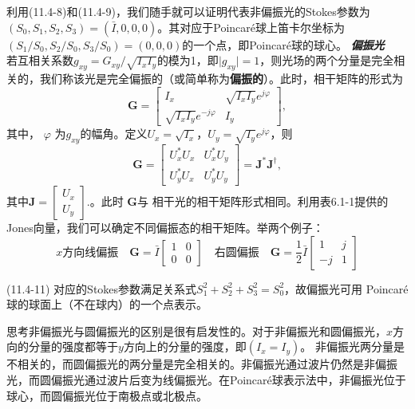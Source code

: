 \documentclass[UTF8]{ctexart}
\numberwithin{figure}{subsection}
\numberwithin{table}{subsection}
\begin{document}
\par 利用(11.4-8)和(11.4-9)，我们随手就可以证明代表非偏振光的Stokes参数为$(S_0, S_1, S_2, S_3) = (\bar{I}, 0, 0, 0)$。其对应于Poincar\'{e}球上笛卡尔坐标为$(S_1 / S_0, S_2 / S_0, S_3 / S_0) = (0, 0, 0)$的一个点，即Poincar\'{e}球的球心。
\bigbreak\noindent\textcolor{ksc}{\textbf{\textsl{偏振光}}}\\
若互相关系数$g_{xy} = G_{xy} / \sqrt{I_x I_y}$的模为1，即$\lvert g_{xy} \rvert = 1$，则光场的两个分量是完全相关的，我们称该光是完全偏振的（或简单称为\textbf{偏振的}）。此时，相干矩阵的形式为
\begin{equation}
\mathbf{G} = 
\begin{bmatrix}
I_x & \sqrt{I_x I_y}e^{j\varphi} \\
\sqrt{I_x I_y}e^{-j\varphi} & I_y
\end{bmatrix} ,
\end{equation}
其中， $\varphi$ 为$g_{xy}$的幅角。定义$U_x = \sqrt{I_x}$，$U_y = \sqrt{I_y}e^{j\varphi}$，则
\begin{equation}
\mathbf{G} =
\begin{bmatrix}
U_x^\ast U_x & U_x^\ast U_y \\
U_y^\ast U_x & U_y^\ast U_y
\end{bmatrix}
= \mathbf{J^\ast J^\dag} ,
\end{equation}
其中$\mathbf{J} = \begin{bmatrix}U_x \\ U_y \end{bmatrix}$.。此时 $\mathbf{G}$与 相干光的相干矩阵形式相同。利用表6.1-1提供的Jones向量，我们可以确定不同偏振态的相干矩阵。举两个例子：
\begin{equation*}
\text{$x$方向线偏振} \quad \mathbf{G} = \bar{I}
\begin{bmatrix}
1 & 0 \\
0 & 0 
\end{bmatrix}
\quad \text{右圆偏振} \quad \mathbf{G} = \frac{1}{2}\bar{I}
\begin{bmatrix}
1 & j \\
-j & 1
\end{bmatrix}
\end{equation*}
\par (11.4-11) 对应的Stokes参数满足关系式$S_1^2 + S_2^2 + S_3^2 = S_0^2$，故偏振光可用 Poincar\'{e}球的球面上（不在球内）的一个点表示。
\par 思考非偏振光与圆偏振光的区别是很有启发性的。对于非偏振光和圆偏振光，$x$方向的分量的强度都等于$y$方向上的分量的强度，即$(I_x = I_y)$。 非偏振光两分量是不相关的，而圆偏振光的两分量是完全相关的。非偏振光通过波片仍然是非偏振光，而圆偏振光通过波片后变为线偏振光。在Poincar\'{e}球表示法中，非偏振光位于球心，而圆偏振光位于南极点或北极点。
\end{document}
